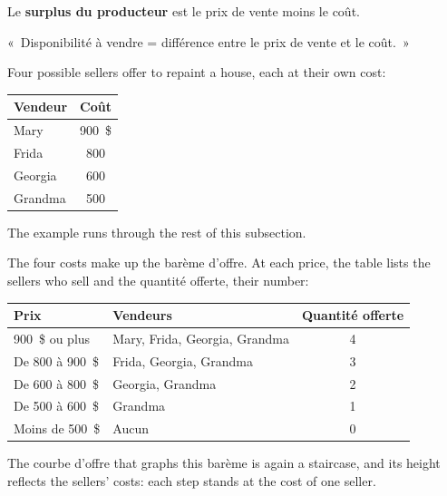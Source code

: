 \begin{definition}
  Le \textbf{surplus du producteur} est le prix de vente moins le coût.
\end{definition}

\begin{remark}
  «~Disponibilité à vendre = différence entre le prix de vente et le coût.~»
\end{remark}

\begin{example}
  Four possible sellers offer to repaint a house, each at their own cost:
  \begin{center}
    \begin{tabular}{@{}lc@{}}
      \toprule
      Vendeur & Coût \\
      \midrule
      Mary & 900~\$ \\
      Frida & 800 \\
      Georgia & 600 \\
      Grandma & 500 \\
      \bottomrule
    \end{tabular}
  \end{center}
  The example runs through the rest of this subsection.
\end{example}

The four costs make up the barème d'offre. At each price, the table lists the
sellers who sell and the quantité offerte, their number:
\begin{center}
  \begin{tabular}{@{}llc@{}}
    \toprule
    Prix & Vendeurs & Quantité offerte \\
    \midrule
    900~\$ ou plus & Mary, Frida, Georgia, Grandma & 4 \\
    De 800 à 900~\$ & Frida, Georgia, Grandma & 3 \\
    De 600 à 800~\$ & Georgia, Grandma & 2 \\
    De 500 à 600~\$ & Grandma & 1 \\
    Moins de 500~\$ & Aucun & 0 \\
    \bottomrule
  \end{tabular}
\end{center}
The courbe d'offre that graphs this barème is again a staircase, and its height
reflects the sellers' costs: each step stands at the cost of one seller.\\

